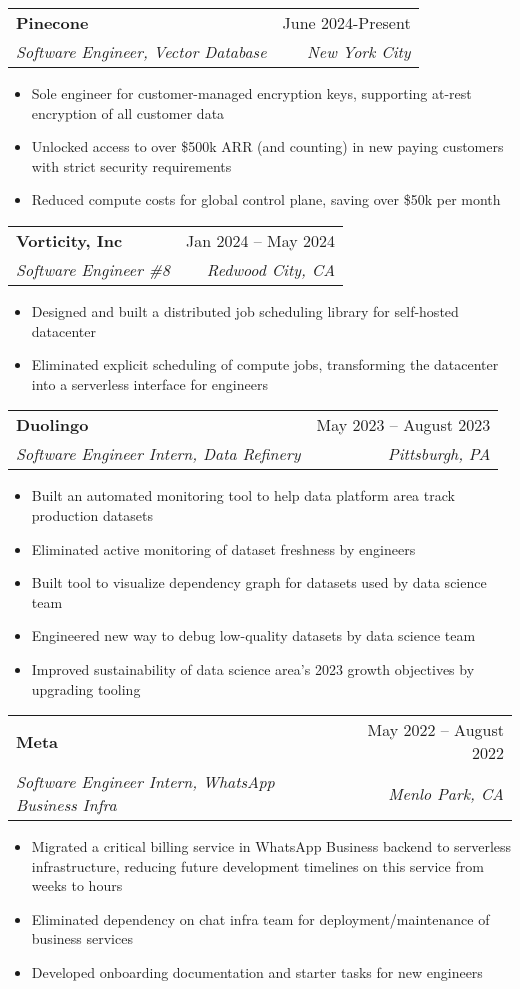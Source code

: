 \documentclass[letterpaper,11pt]{article}
\makeatletter
\newcommand{\resumeItem}[1]{
  \item\small{
    {#1 \vspace{-2pt}}
  }
}
\newcommand{\resumeSubheading}[4]{
  \vspace{-2pt}\item
    \begin{tabular*}{0.97\textwidth}[t]{l@{\extracolsep{\fill}}r}
      \textbf{#1} & #2 \\
      \textit{\small#3} & \textit{\small #4} \\
    \end{tabular*}\vspace{-7pt}
}
\newcommand{\resumeItemListStart}{\begin{itemize}}
\newcommand{\resumeItemListEnd}{\end{itemize}\vspace{-5pt}}
\makeatother
\begin{document}
    \resumeSubheading
      {Pinecone}{June 2024-Present}
      {Software Engineer, Vector Database}{New York City}
      \resumeItemListStart
        \resumeItem{Sole engineer for customer-managed encryption keys, supporting at-rest encryption of all customer data}
        \resumeItem{Unlocked access to over \$500k ARR (and counting) in new paying customers with strict security requirements}
        \resumeItem{Reduced compute costs for global control plane, saving over \$50k per month}
      \resumeItemListEnd
    \resumeSubheading
      {Vorticity, Inc}{Jan 2024 -- May 2024}
      {Software Engineer \#8}{Redwood City, CA}
      \resumeItemListStart
        \resumeItem{Designed and built a distributed job scheduling library for self-hosted datacenter}
        \resumeItem{Eliminated explicit scheduling of compute jobs, transforming the datacenter into a serverless interface for engineers}
      \resumeItemListEnd
    \resumeSubheading
      {Duolingo}{May 2023 -- August 2023}
      {Software Engineer Intern, Data Refinery}{Pittsburgh, PA}
      \resumeItemListStart
      \resumeItem{Built an automated monitoring tool to help data platform area track production datasets}
      \resumeItem{Eliminated active monitoring of dataset freshness by engineers}
      \resumeItem{Built tool to visualize dependency graph for datasets used by data science team}
      \resumeItem{Engineered new way to debug low-quality datasets by data science team}
      \resumeItem{Improved sustainability of data science area's 2023 growth objectives by upgrading tooling}
      \resumeItemListEnd
    \resumeSubheading
        {Meta}{May 2022 -- August 2022}
        {Software Engineer Intern, WhatsApp Business Infra}{Menlo Park, CA}
        \resumeItemListStart
          \resumeItem{Migrated a critical billing service in WhatsApp Business backend to serverless infrastructure, reducing future development timelines on this service from weeks to hours}
          \resumeItem{Eliminated dependency on chat infra team for deployment/maintenance of business services}
          \resumeItem{Developed onboarding documentation and starter tasks for new engineers}
        \resumeItemListEnd
\end{document}
